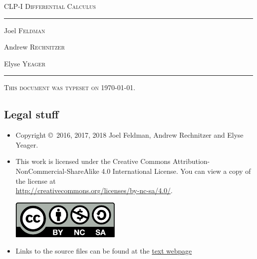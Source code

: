 \documentclass[12pt,letterpaper]{book}
\begin{document}
\setcounter{page}{0}

\begin{titlepage}
\begin{center}
\textsc{\LARGE CLP-I Differential Calculus
}\\[2ex]

\vspace{5ex}
\hrule
\vspace{5ex}

\begin{minipage}[t]{0.3\textwidth} \begin{flushleft}
\large Joel \textsc{Feldman}
\end{flushleft} \end{minipage}%
\begin{minipage}[t]{0.3\textwidth} \begin{flushleft}
\large Andrew \textsc{Rechnitzer}
\end{flushleft} \end{minipage}%
\begin{minipage}[t]{0.3\textwidth} \begin{flushright}
\large Elyse \textsc{Yeager}
\end{flushright} \end{minipage}%
\end{center}
\vspace{2ex}
\hrule

\vfill
\textsc{This document was typeset on \today.}
\end{titlepage}

\subsection*{Legal stuff}
\begin{itemize}
 \item Copyright \copyright\ 2016, 2017, 2018 Joel Feldman, Andrew Rechnitzer and Elyse Yeager.

\item This work is licensed under the
Creative Commons Attribution-NonCommercial-ShareAlike 4.0 International
License. You can view a copy of the license at \\
\url{http://creativecommons.org/licenses/by-nc-sa/4.0/}.
\begin{center}
 \includegraphics{by-nc-sa.pdf}
\end{center}


\item Links to the source files can be found at the \href{http://www.math.ubc.ca/~CLP/index.html}{text webpage}
\end{itemize}

\frontmatter


\tableofcontents

\mainmatter

\setcounter{chapter}{-1}





\appendix

\end{document}

